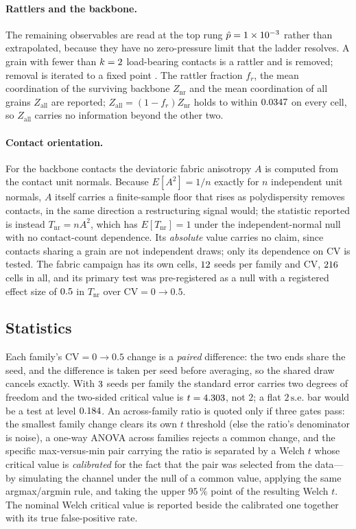 \documentclass[reprint,aps,pre,amsmath,amssymb,superscriptaddress,longbibliography,nofootinbib,floatfix]{revtex4-2}
\newcommand{\pHat}{\hat{p}}
\newcommand{\Znr}{Z_{\mathrm{nr}}}
\newcommand{\Zall}{Z_{\mathrm{all}}}
\newcommand{\fr}{f_{r}}
\newcommand{\Tnr}{T_{\mathrm{nr}}}
\newcommand{\CV}{\mathrm{CV}}
\begin{document}
\paragraph{Rattlers and the backbone.}
The remaining observables are read at the top rung $\pHat=\pHatTop$ rather than extrapolated, because they have no zero-pressure limit that the ladder resolves.
A grain with fewer than $k=2$ load-bearing contacts is a rattler and is removed; removal is iterated to a fixed point \cite{ohern2003jamming,vanhecke2010jamming}.
The rattler fraction $\fr$, the mean coordination of the surviving backbone $\Znr$ and the mean coordination of all grains $\Zall$ are reported; $\Zall=(1-\fr)\Znr$ holds to within $0.0347$ on every cell, so $\Zall$ carries no information beyond the other two.

\paragraph{Contact orientation.}
For the backbone contacts the deviatoric fabric anisotropy $A$ is computed from the contact unit normals.
Because $E[A^2]=1/n$ exactly for $n$ independent unit normals, $A$ itself carries a finite-sample floor that rises as polydispersity removes contacts, in the same direction a restructuring signal would; the statistic reported is instead $\Tnr = n A^2$, which has $E[\Tnr]=1$ under the independent-normal null with no contact-count dependence.
Its \emph{absolute} value carries no claim, since contacts sharing a grain are not independent draws; only its dependence on $\CV$ is tested.
The fabric campaign has its own cells, $12$ seeds per family and $\CV$, $216$ cells in all, and its primary test was pre-registered as a null with a registered effect size of $0.5$ in $\Tnr$ over $\CV=0\to0.5$.

\subsection{Statistics}

Each family's $\CV=0\to0.5$ change is a \emph{paired} difference: the two ends share the seed, and the difference is taken per seed before averaging, so the shared draw cancels exactly.
With $3$ seeds per family the standard error carries two degrees of freedom and the two-sided critical value is $t=4.303$, not $2$; a flat $2\,\mathrm{s.e.}$ bar would be a test at level $0.184$.
An across-family ratio is quoted only if three gates pass: the smallest family change clears its own $t$ threshold (else the ratio's denominator is noise), a one-way ANOVA across families rejects a common change, and the specific max-versus-min pair carrying the ratio is separated by a Welch $t$ whose critical value is \emph{calibrated} for the fact that the pair was selected from the data---by simulating the channel under the null of a common value, applying the same argmax/argmin rule, and taking the upper $95\,\%$ point of the resulting Welch $t$.
The nominal Welch critical value is reported beside the calibrated one together with its true false-positive rate.
\end{document}
